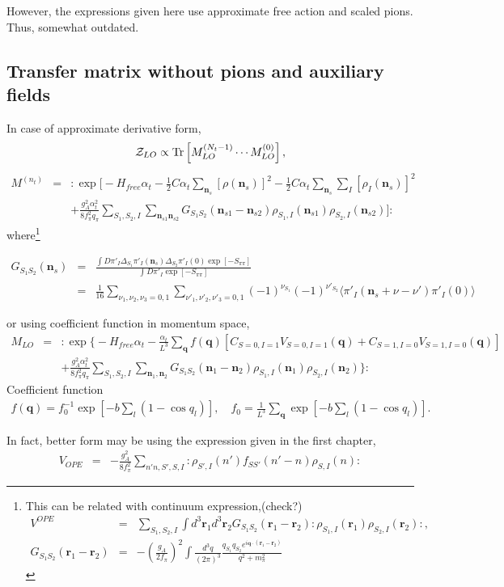 \documentclass[10pt]{book}
\def\bm{\boldsymbol}
\newcommand{\bea}{\begin{eqnarray}}
\newcommand{\eea}{\end{eqnarray}}
\newcommand{\no}{\nonumber \\}
\def\vn{{\bm n}}
\def\vq{{\bm q}}
\def\vr{{\bm r}}
\def\la{\langle}
\def\ra{\rangle}
\begin{document}
{\color{red} However, the expressions given here use approximate free action and
	scaled pions. Thus, somewhat outdated. }

\subsection{Transfer matrix without pions and auxiliary fields} 

In case of approximate derivative form, 
\bea 
{\cal Z}_{LO}\propto {\rm Tr}\left[
           M_{LO}^{(N_t-1)}\cdots M_{LO}^{(0)}\right],
\eea 
\bea 
M^{(n_t)}&=& : \exp \Big[ -H_{free}\alpha_t-\frac{1}{2}C\alpha_t \sum_{\vn_s}[\rho(\vn_s)]^2
                  -\frac{1}{2}C\alpha_t \sum_{\vn_s}\sum_{I} [\rho_I (\vn_s)]^2 
                  \no & & 
                  +\frac{g_A^2 \alpha_t^2}{8 f_\pi^2 q_\pi}
                  \sum_{S_1,S_2,I}\sum_{\vn_{s1}\vn_{s2}}
                  G_{S_1S_2}(\vn_{s1}-\vn_{s2})\rho_{S_1,I}(\vn_{s1})\rho_{S_2,I}(\vn_{s2})
                  \Big]:
\eea 
where\footnote{ 
	This can be related with continuum expression,(check?)
	\bea 
	V^{OPE}&=& \sum_{S_1,S_2,I}\int d^3 \vr_1 d^3 \vr_2 G_{S_1 S_2}(\vr_1-\vr_2)
	:\rho_{S_1,I}(\vr_1)\rho_{S_2,I}(\vr_2):,\no 
	G_{S_1 S_2}(\vr_1-\vr_2)&=&
	-(\frac{g_A}{2 f_\pi})^2 \int \frac{d^3 q}{(2\pi)^3}
	\frac{q_{S_1}q_{S_2} e^{i\vq\cdot(\vr_1-\vr_2)}}{q^2+m_\pi^2}
	\eea 
}

\bea 
G_{S_1 S_2}(\vn_s)&=&\frac{\int D\pi'_I \Delta_{S_1}\pi'_I(\vn_s) 
           \Delta_{S_2}\pi'_I(0) \exp[-S_{\pi\pi}]} {\int D\pi'_I \exp[-S_{\pi\pi}]}\no 
      &=&\frac{1}{16}\sum_{\nu_1,\nu_2,\nu_3=0,1}
                     \sum_{\nu'_1,\nu'_2,\nu'_3=0,1}
                     (-1)^{\nu_{S_1}}(-1)^{\nu'_{S_2}}
                     \la \pi'_I(\vn_s+\nu-\nu')\pi'_I(0)\ra 
\eea 

or using coefficient function in momentum space,
\bea 
M_{LO}&=& :\exp\Big\{ -H_{free}\alpha_t -\frac{\alpha_t}{L^3}\sum_{\vq} f(\vq)
    [C_{S=0,I=1} V_{S=0,I=1}(\vq)+ C_{S=1,I=0} V_{S=1,I=0}(\vq)]
    \no & &
    +\frac{g_A^2\alpha_t^2}{8f_\pi^2 q_\pi} \sum_{S_1,S_2,I}
    \sum_{\vn_1,\vn_2}G_{S_1 S_2}(\vn_1-\vn_2)\rho_{S_1,I}(\vn_1)\rho_{S_2,I}(\vn_2)
\Big\}: 
\eea 
Coefficient function
\bea 
f(\vq)=f_0^{-1} \exp[-b\sum_{l}(1-\cos q_l)],
\quad f_0=\frac{1}{L^3}\sum_{\vq} \exp[-b\sum_{l}(1-\cos q_l)].
\eea 

In fact, better form may be using the expression given in the first chapter,
\bea 
V_{OPE}&=&-\frac{g_A^2}{8f_\pi^2}\sum_{n'n,S',S,I} : \rho_{S',I}(n')f_{SS'}(n'-n)\rho_{S,I}(n):
\eea  
\end{document}
